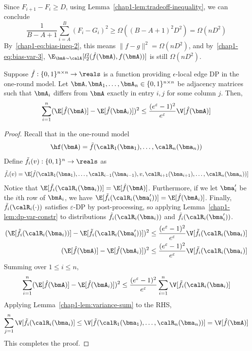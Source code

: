 Since $F_{i+1} - F_i \geq D$, using Lemma~\ref{chap1-lem:tradeoff-inequality}, we can conclude
\[
    \frac{1}{B-A+1} \sum_{i=A}^{B} (F_i - G_i)^2 \geq \Omega((B-A+1)^2 D^2) = \Omega(nD^2)
\]
By~\eqref{chap1-eq:bias-ineq-2}, this means $\|f-g\|^2 = \Omega (nD^2)$, and
by~\eqref{chap1-eq:bias-var-3}, $\E_{\bmA \sim \calA} [l_2^2(\hat{f}(\bmA),f(\bmA))]$ is 
still $\Omega(nD^2)$.

\begin{lemma}\label{chap1-lem:var-to-inf}
Suppose $\hat{f} : \{0,1\}^{n \times n} \rightarrow \reals$ is 
a function providing $\epsilon$-local edge DP in the one-round model. Let $\bmA,\bmA_1,\ldots,
\bmA_n \in \{0,1\}^{n \times n}$ be adjacency matrices such that $\bmA_i$ 
differs from $\bmA$ exactly in entry $i,j$ for some column $j$. Then,
\begin{equation*}
    \sum_{i=1}^n (\E[\hat{f}(\bmA)] - \E[\hat{f}(\bmA_i)])^2 \leq \frac{(e^\varepsilon-1)^2}{e^\varepsilon}\V[\hat{f}(\bmA)]
\end{equation*}

\end{lemma} 
\begin{proof}

Recall that in the one-round model
\[
  \hf(\bmA) = \tilde{f}(\calR_1(\bma_1),\ldots, \calR_n(\bma_n))
\]
Define $\tilde{f}_i(v) : \{0,1\}^n \rightarrow \reals$ as
\[
    \tilde{f}_i(v) = \E[\tilde{f}(\calR_1(\bma_1),\ldots,
    \calR_{i-1}(\bma_{i-1}), v, \calR_{i+1}(\bma_{i+1}), \ldots, \calR_n(\bma_n))]
\]
Notice that $\E[\tilde{f}_i(\calR_i(\bma_i))] = \E[\hat{f}(\bmA)]$. Furthermore,
if we let $\bma_i'$ be the $i$th row of $\bmA_i$, we have
$\E[\tilde{f}_i(\calR_i(\bma_i'))] = \E[\hat{f}(\bmA_i)]$. Finally,
$\tilde{f}_i(\calR_i(\cdot))$ satisfies $\varepsilon$-DP by post-processing, so
applying Lemma~\ref{chap1-lem:dp-var-constr} to distributions
$\tilde{f}_i(\calR_i(\bma_i))$ and $\tilde{f}_i(\calR_i(\bma_i'))$.
\begin{align*}
  (\E[\tilde{f}_i(\calR_i(\bma_i))] - \E[\tilde{f}_i(\calR_i(\bma_i'))])^2 
  &\leq \frac{(e^\varepsilon -
  1)^2}{e^\varepsilon} \V[\tilde{f}_i(\calR_i(\bma_i)] \\
  (\E[\hat{f}(\bmA)] - \E[\hat{f}(\bmA_i)])^2 &\leq \frac{(e^\varepsilon -
  1)^2}{e^\varepsilon} \V[\tilde{f}_i(\calR_i(\bma_i)]
\end{align*}
Summing over $1 \leq i \leq n$,
\begin{align*}
\sum_{i=1}^n (\E[\hat{f}(\bmA)] - \E[\hat{f}(\bmA_i)])^2 \leq 
  \frac{(e^\varepsilon - 1)^2}{e^\varepsilon} \sum_{i=1}^n
  \V[\tilde{f}_i(\calR_i(\bma_i)] 
\end{align*}
Applying Lemma~\ref{chap1-lem:variance-sum} to the RHS,
\begin{align*}
    \sum_{j=1}^n \V[\tilde{f}_i(\calR_i(\bma_i)] \leq
      \V[\tilde{f}(\calR_1(\bma_1), \ldots, \calR_n(\bma_n))] = \V[\hat{f}(\bmA)]
\end{align*}
This completes the proof.
\end{proof}

